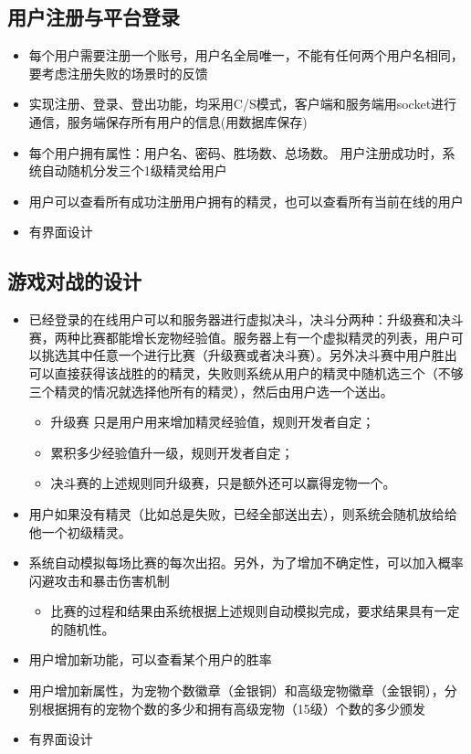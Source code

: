\documentclass{article}
\begin{document}
\subsection{用户注册与平台登录}
  \begin{itemize}
  \item 每个用户需要注册一个账号，用户名全局唯一，不能有任何两个用户名相同，要考虑注册失败的场景时的反馈
  \item 实现注册、登录、登出功能，均采用C/S模式，客户端和服务端用socket进行通信，服务端保存所有用户的信息(用数据库保存) 
  \item 每个用户拥有属性：用户名、密码、胜场数、总场数。 用户注册成功时，系统自动随机分发三个1级精灵给用户
  \item 用户可以查看所有成功注册用户拥有的精灵，也可以查看所有当前在线的用户
  \item 有界面设计
  \end{itemize}
\subsection{游戏对战的设计}
  \begin{itemize}
  \item 已经登录的在线用户可以和服务器进行虚拟决斗，决斗分两种：升级赛和决斗赛，两种比赛都能增长宠物经验值。服务器上有一个虚拟精灵的列表，用户可以挑选其中任意一个进行比赛（升级赛或者决斗赛）。另外决斗赛中用户胜出可以直接获得该战胜的的精灵，失败则系统从用户的精灵中随机选三个（不够三个精灵的情况就选择他所有的精灵），然后由用户选一个送出。
    \begin{itemize}
    \item 升级赛 只是用户用来增加精灵经验值，规则开发者自定；
    \item 累积多少经验值升一级，规则开发者自定；
    \item 决斗赛的上述规则同升级赛，只是额外还可以赢得宠物一个。
    \end{itemize}
  \item 用户如果没有精灵（比如总是失败，已经全部送出去），则系统会随机放给给他一个初级精灵。
  \item 系统自动模拟每场比赛的每次出招。另外，为了增加不确定性，可以加入概率闪避攻击和暴击伤害机制
    \begin{itemize}
    \item 比赛的过程和结果由系统根据上述规则自动模拟完成，要求结果具有一定的随机性。
    \end{itemize}
  \item 用户增加新功能，可以查看某个用户的胜率
  \item 用户增加新属性，为宠物个数徽章（金银铜）和高级宠物徽章（金银铜），分别根据拥有的宠物个数的多少和拥有高级宠物（15级）个数的多少颁发
  \item 有界面设计
  \end{itemize}
\end{document}
